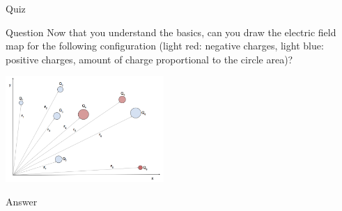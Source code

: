 {
\problemslide

\begin{frame}{Quiz}

\begin{blockexmplque}{Question}
   Now that you understand the basics, can you draw the electric field map for the following configuration
   (light red: negative charges, light blue: positive charges, amount of charge proportional to the circle area)?
   \vspace{0.3cm}
   \begin{center}
     \includegraphics[width=0.45\textwidth]{./images/problems/lect01_n_charges.png}\\
   \end{center}
\end{blockexmplque}

\begin{blockexmplans}{Answer}
\noindent
\end{blockexmplans}

\end{frame}

} %

%
%
%

